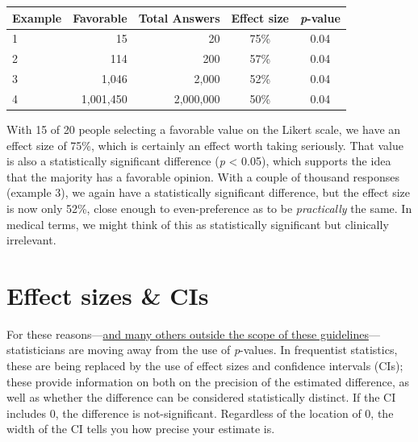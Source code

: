 \documentclass[]{book}
\newenvironment{Shaded}{\begin{snugshade}}{\end{snugshade}}
\newcommand{\KeywordTok}[1]{\textcolor[rgb]{0.13,0.29,0.53}{\textbf{{#1}}}}
\newcommand{\DataTypeTok}[1]{\textcolor[rgb]{0.13,0.29,0.53}{{#1}}}
\newcommand{\DecValTok}[1]{\textcolor[rgb]{0.00,0.00,0.81}{{#1}}}
\newcommand{\StringTok}[1]{\textcolor[rgb]{0.31,0.60,0.02}{{#1}}}
\newcommand{\NormalTok}[1]{{#1}}
\begin{document}
\begin{longtable}[]{@{}lrrcc@{}}
\toprule
Example & Favorable & Total Answers & Effect size &
\emph{p}-value\tabularnewline
\midrule
\endhead
1 & 15 & 20 & 75\% & 0.04\tabularnewline
2 & 114 & 200 & 57\% & 0.04\tabularnewline
3 & 1,046 & 2,000 & 52\% & 0.04\tabularnewline
4 & 1,001,450 & 2,000,000 & 50\% & 0.04\tabularnewline
\bottomrule
\end{longtable}

With 15 of 20 people selecting a favorable value on the Likert scale, we
have an effect size of 75\%, which is certainly an effect worth taking
seriously. That value is also a statistically significant difference
(\emph{p} \textless{} 0.05), which supports the idea that the majority
has a favorable opinion. With a couple of thousand responses (example
3), we again have a statistically significant difference, but the effect
size is now only 52\%, close enough to even-preference as to be
\emph{practically} the same. In medical terms, we might think of this as
statistically significant but clinically irrelevant.

\section{Effect sizes \& CIs}\label{effect-sizes-cis}

For these
reasons---\href{http://www.tandfonline.com/doi/full/10.1080/00031305.2016.1154108}{and
many others outside the scope of these guidelines}---statisticians are
moving away from the use of \emph{p}-values. In frequentist statistics,
these are being replaced by the use of effect sizes and confidence
intervals (CIs); these provide information on both on the precision of
the estimated difference, as well as whether the difference can be
considered statistically distinct. If the CI includes 0, the difference
is not-significant. Regardless of the location of 0, the width of the CI
tells you how precise your estimate is.

\begin{Shaded}
\end{Shaded}
\end{document}
